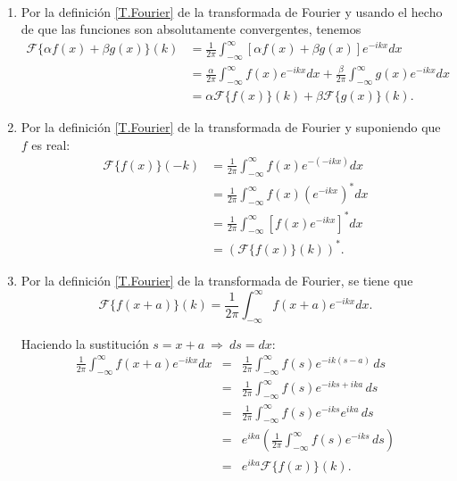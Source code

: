 \begin{demo}
\

\begin{enumerate}
    \item Por la definición \eqref{T.Fourier} de la transformada de Fourier y usando el hecho de que las funciones son absolutamente convergentes, tenemos
    \begin{align*}
        \mathcal{F}\{\alpha f(x) + \beta g(x)\}(k) &= \frac{1}{2\pi} \int_{-\infty}^{\infty} [\alpha f(x) + \beta g(x)] e^{-ikx} dx \\
        &= \frac{\alpha}{2\pi} \int_{-\infty}^{\infty}  f(x) e^{-ikx} dx + \frac{\beta}{2\pi} \int_{-\infty}^{\infty}  g(x) e^{-ikx} dx \\
        &= \alpha \mathcal{F}\{f(x)\}(k) + \beta \mathcal{F}\{g(x)\}(k).
    \end{align*}
    
    \item Por la definición \eqref{T.Fourier} de la transformada de Fourier y suponiendo que $f$ es real:
    \begin{align*}
        \mathcal{F}\{f(x)\}(-k) &= \frac{1}{2\pi} \int_{-\infty}^{\infty}  f(x)  e^{-(-ikx)} dx  \\
        &= \frac{1}{2\pi} \int_{-\infty}^{\infty}  f(x)  (e^{-ikx})^* dx  \\
        &= \frac{1}{2\pi} \int_{-\infty}^{\infty}  [f(x)  e^{-ikx}]^* dx \\
        &= (\mathcal{F}\{f(x)\}(k))^*.
    \end{align*}
    
    \item Por la definición \eqref{T.Fourier} de la transformada de Fourier, se tiene que
$$\mathcal{F}\{f(x+a)\}(k) = \frac{1}{2\pi} \int_{-\infty}^{\infty} f(x+a) e^{-ikx} dx. $$

Haciendo la sustitución $s = x +a ~\Rightarrow~ ds = dx$:
\begin{eqnarray*}
 \frac{1}{2\pi} \int_{-\infty}^{\infty} f(x+a) e^{-ikx} dx &=& \frac{1}{2\pi} \int_{-\infty}^{\infty} f(s) e^{-ik(s-a)} \,ds \\
 &=& \frac{1}{2\pi} \int_{-\infty}^{\infty} f(s) e^{-iks+ika} \,ds \\
&=& \frac{1}{2\pi} \int_{-\infty}^{\infty} f(s) e^{-iks} e^{ika} \,ds \\
&=& e^{ika}  \left(\frac{1}{2\pi} \int_{-\infty}^{\infty} f(s) e^{-iks} \,ds \right) \\
&=& e^{ika} \mathcal{F}\{f(x)\}(k).
\end{eqnarray*}


\end{enumerate}
\end{demo}
